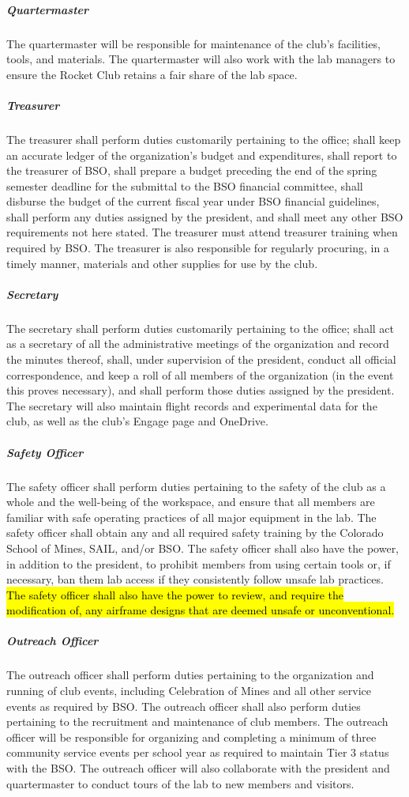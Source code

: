 \documentclass[12pt]{article}
\begin{document}
\subparagraph{Quartermaster} The quartermaster will be responsible for maintenance of the club's facilities, tools, and materials. 
The quartermaster will also work with the lab managers to ensure the Rocket Club retains a fair share of the lab space.

\subparagraph{Treasurer} The treasurer shall perform duties customarily pertaining to the office; 
shall keep an accurate ledger of the organization's budget and expenditures, 
shall report to the treasurer of BSO, 
shall prepare a budget preceding the end of the spring semester deadline for the submittal to the BSO financial committee, 
shall disburse the budget of the current fiscal year under BSO financial guidelines, 
shall perform any duties assigned by the president, and shall meet any other BSO requirements not here stated. 
The treasurer must attend treasurer training when required by BSO. 
The treasurer is also responsible for regularly procuring, in a timely manner, 
materials and other supplies for use by the club. 

\subparagraph{Secretary} The secretary shall perform duties customarily pertaining to the office; 
shall act as a secretary of all the administrative meetings of the organization and record the minutes thereof, 
shall, under supervision of the president, conduct all official correspondence, 
and keep a roll of all members of the organization (in the event this proves necessary), 
and shall perform those duties assigned by the president. 
The secretary will also maintain flight records and experimental data for the club, 
as well as the club's Engage page and OneDrive.

\subparagraph{Safety Officer} The safety officer shall perform duties pertaining to the safety of the club as a whole and the well-being of the workspace, 
and ensure that all members are familiar with safe operating practices of all major equipment in the lab. 
The safety officer shall obtain any and all required safety training by the Colorado School of Mines, SAIL, and/or BSO. 
The safety officer shall also have the power, in addition to the president, 
to prohibit members from using certain tools or, if necessary, 
ban them lab access if they consistently follow unsafe lab practices.
\hl{
The safety officer shall also have the power to review, and require the modification of, any airframe designs that are deemed unsafe or unconventional.
}

\subparagraph{Outreach Officer} The outreach officer shall perform duties pertaining to the organization and running of club events, 
including Celebration of Mines and all other service events as required by BSO. 
The outreach officer shall also perform duties pertaining to the recruitment and maintenance of club members. 
The outreach officer will be responsible for organizing and completing a minimum of three community service events per school year as required to maintain Tier 3 status with the BSO. 
The outreach officer will also collaborate with the president and quartermaster to conduct tours of the lab to new members and visitors.
\end{document}
